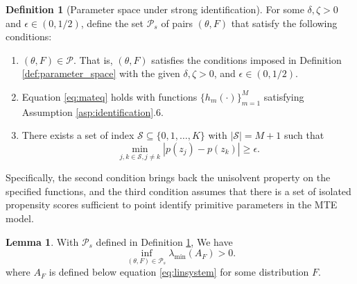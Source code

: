 \documentclass[11pt]{article}
\theoremstyle{definition}
\newtheorem{lemma}{Lemma}[section]
\newtheorem{definition}{Definition}[section]
\newcommand{\0}{\ensuremath{\mathbf{0}}}
\begin{document}
\begin{bibunit}
\begin{definition}[Parameter space under strong identification]
\label{def:strong_id_para_space}
For some $\delta, \zeta > 0$ and $\epsilon \in (0,1/2)$, define the set $\mathcal{P}_s$ of pairs $(\theta, F)$ that satisfy the following conditions:
\begin{enumerate}
    \item $(\theta, F) \in \mathcal{P}$. That is, $(\theta,F)$ satisfies the conditions imposed in Definition \ref{def:parameter_space} with the given $\delta, \zeta > 0$, and $\epsilon \in (0,1/2)$.
    \item Equation \eqref{eq:mateq} holds with functions $\{h_m(\cdot)\}_{m=1}^M$ satisfying Assumption \ref{asp:identification}.6.
    \item There exists a set of index $\mathcal{S} \subseteq \{0,1,\ldots,K\}$ with $|\mathcal{S}| = M+1$ such that 
    \[
        \min_{j,k\in\mathcal{S}, j \neq k} |p(z_j) - p(z_k)| \geq \epsilon.
    \]
\end{enumerate}
\end{definition}

Specifically, the second condition brings back the unisolvent property on the specified functions, and the third condition assumes that there is a set of isolated propensity scores sufficient to point identify primitive parameters in the MTE model. 

\begin{lemma}
\label{lem:full_rank_A}
With $\mathcal{P}_s$ defined in Definition \ref{def:strong_id_para_space}, We have 
\[
    \inf_{(\theta,F)\in \mathcal{P}_s} \lambda_{\min}(A_F) > 0.
\]
where $A_F$ is defined below equation \eqref{eq:linsystem} for some distribution $F$.
\end{lemma}



\end{bibunit}
\end{document}
